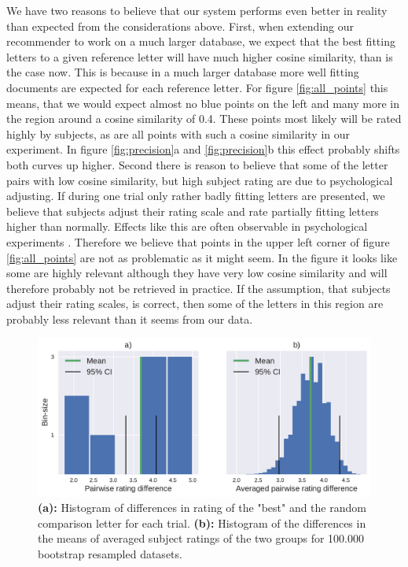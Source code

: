 We have two reasons to believe that our system performs even better in reality than expected from the considerations above. First, when extending our recommender to work on a much larger database, we expect that the best fitting letters to a given reference letter will have much higher cosine similarity, than is the case now. This is because in a much larger database more well fitting documents are expected for each reference letter. For figure \ref{fig:all_points} this means, that we would expect almost no blue points on the left and many more in the region around a cosine similarity of 0.4. These points most likely will be rated highly by subjects, as are all points with such a cosine similarity in our experiment. In figure \ref{fig:precision}a and \ref{fig:precision}b this effect probably shifts both curves up higher. Second there is reason to believe that some of the letter pairs with low cosine similarity, but high subject rating are due to psychological adjusting. If during one trial only rather badly fitting letters are presented, we believe that subjects adjust their rating scale and rate partially fitting letters higher than normally. Effects like this are often observable in psychological experiments \citep{Poulton1975}. Therefore we believe that points in the upper left corner of figure \ref{fig:all_points} are not as problematic as it might seem. In the figure it looks like some are highly relevant although they have very low cosine similarity and will therefore probably not be retrieved in practice. If the assumption, that subjects adjust their rating scales, is correct, then some of the letters in this region are probably less relevant than it seems from our data.

\begin{figure}
	\includegraphics[width=\textwidth]{figures/both_diff_pv}
	
	\caption{\textbf{(a):} Histogram of differences in rating of the "best" and the random comparison letter for each trial.
		\textbf{(b):} Histogram of the differences in the means of averaged subject ratings of the two groups for 100.000 bootstrap resampled datasets.}
	\label{fig:both_diff_pv}
\end{figure}

